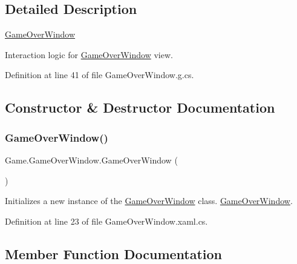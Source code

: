\subsection{Detailed Description}
\mbox{\hyperlink{class_game_1_1_game_over_window}{Game\+Over\+Window}} 

Interaction logic for \mbox{\hyperlink{class_game_1_1_game_over_window}{Game\+Over\+Window}} view.

Definition at line 41 of file Game\+Over\+Window.\+g.\+cs.



\subsection{Constructor \& Destructor Documentation}
\mbox{\label{class_game_1_1_game_over_window_a0e8afb0d7fc7db6ab4e2f8d72f09664e}} 
\subsubsection{\texorpdfstring{GameOverWindow()}{GameOverWindow()}}
{\footnotesize\ttfamily Game.\+Game\+Over\+Window.\+Game\+Over\+Window (\begin{DoxyParamCaption}{ }\end{DoxyParamCaption})}



Initializes a new instance of the \mbox{\hyperlink{class_game_1_1_game_over_window}{Game\+Over\+Window}} class. \mbox{\hyperlink{class_game_1_1_game_over_window}{Game\+Over\+Window}}. 



Definition at line 23 of file Game\+Over\+Window.\+xaml.\+cs.



\subsection{Member Function Documentation}
\mbox{\label{class_game_1_1_game_over_window_ac79eae24ff9056e4070cab127e910d60}} 
